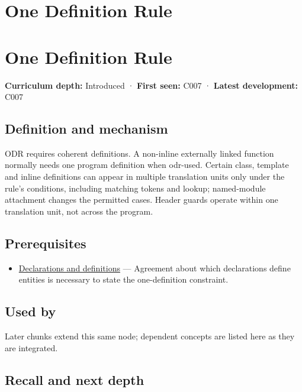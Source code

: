 \hypertarget{appendix-49d27bc9d9a5}{}
\section*{One Definition Rule}
\section{One Definition Rule}\label{one-definition-rule}

\textbf{Curriculum depth:} Introduced · \textbf{First seen:} C007 · \textbf{Latest development:} C007

\subsection{Definition and mechanism}\label{definition-and-mechanism}

ODR requires coherent definitions. A non-inline externally linked function normally needs one program definition when odr-used. Certain class, template and inline definitions can appear in multiple translation units only under the rule's conditions, including matching tokens and lookup; named-module attachment changes the permitted cases. Header guards operate within one translation unit, not across the program.

\subsection{Prerequisites}\label{prerequisites}

\begin{itemize}
\tightlist
\item
  \hyperref[appendix-2e4d494c2d94]{Declarations and definitions} --- Agreement about which declarations define entities is necessary to state the one-definition constraint.
\end{itemize}

\subsection{Used by}\label{used-by}

Later chunks extend this same node; dependent concepts are listed here as they are integrated.

\subsection{Recall and next depth}\label{recall-and-next-depth}

